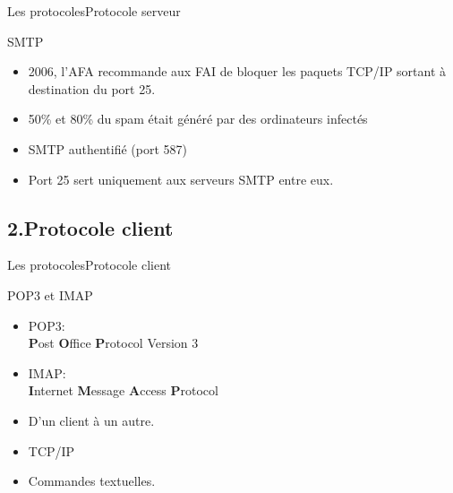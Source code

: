 \documentclass{beamer}
\begin{document}
\begin{frame}{Les protocoles}{Protocole serveur}
  \begin{block}{SMTP}
  \begin{itemize}
    \item<1->{
     2006, l'AFA recommande aux FAI de bloquer les paquets TCP/IP sortant à destination du port 25.
    }
    \item<2->{
    50\% et 80\% du spam était généré par des ordinateurs infectés
    }
    \item<3->{
    SMTP authentifié (port 587)
    }
    \item<4->{
    Port 25 sert uniquement aux serveurs SMTP entre eux.
    }
  \end{itemize}
  \end{block}
\end{frame}

\subsection{2.Protocole client}
\begin{frame}{Les protocoles}{Protocole client}
  \begin{block}{POP3 et IMAP}
  \begin{itemize}
    \item<1->{
    POP3:\\
    \textbf{P}ost \textbf{O}ffice \textbf{P}rotocol Version 3
    } 
    \item<2->{
    IMAP:\\
    \textbf{I}nternet \textbf{M}essage \textbf{A}ccess \textbf{P}rotocol
    }
  \item<3->{
    D'un client à un autre. 
    }
   \item<4->{
    TCP/IP
    }
    \item<5->{
    Commandes textuelles.
    }
  \end{itemize}
  \end{block}
\end{frame}
\end{document}
